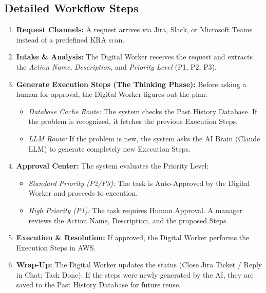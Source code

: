 \documentclass[12pt,a4paper]{article}
\begin{document}
\subsection*{Detailed Workflow Steps}
\begin{enumerate}[label=\textbf{\arabic*.}]
    \item \textbf{Request Channels:} A request arrives via Jira, Slack, or Microsoft Teams instead of a predefined KRA scan.
    \item \textbf{Intake \& Analysis:} The Digital Worker receives the request and extracts the \textit{Action Name}, \textit{Description}, and \textit{Priority Level} (P1, P2, P3).
    \item \textbf{Generate Execution Steps (The Thinking Phase):} Before asking a human for approval, the Digital Worker figures out the plan:
    \begin{itemize}
        \item \textit{Database Cache Route:} The system checks the Past History Database. If the problem is recognized, it fetches the previous Execution Steps.
        \item \textit{LLM Route:} If the problem is new, the system asks the AI Brain (Claude LLM) to generate completely new Execution Steps.
    \end{itemize}
    \item \textbf{Approval Center:} The system evaluates the Priority Level:
    \begin{itemize}
        \item \textit{Standard Priority (P2/P3):} The task is Auto-Approved by the Digital Worker and proceeds to execution.
        \item \textit{High Priority (P1):} The task requires Human Approval. A manager reviews the Action Name, Description, and the proposed Steps.
    \end{itemize}
    \item \textbf{Execution \& Resolution:} If approved, the Digital Worker performs the Execution Steps in AWS.
    \item \textbf{Wrap-Up:} The Digital Worker updates the status (Close Jira Ticket / Reply in Chat: Task Done). If the steps were newly generated by the AI, they are saved to the Past History Database for future reuse.
\end{enumerate}
\end{document}
